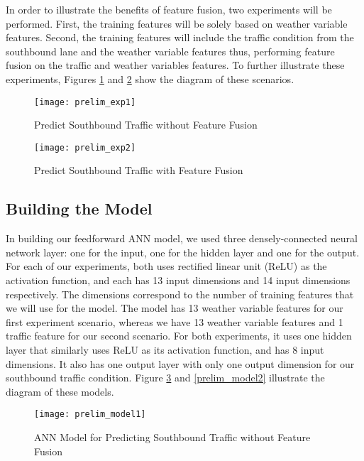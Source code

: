 In order to illustrate the benefits of feature fusion, two experiments will be performed. First, the training features will be solely based on weather variable features. Second, the training features will include the traffic condition from the southbound lane and the weather variable features thus, performing feature fusion on the traffic and weather variables features. To further illustrate these experiments, Figures \ref{figure:prelim_exp1} and \ref{figure:prelim_exp2} show the diagram of these scenarios.




\begin{figure}[!t]
\caption{Predict Southbound Traffic without Feature Fusion}
\centering
\texttt{[image: prelim\_exp1]}
\label{figure:prelim_exp1}
\end{figure}

\begin{figure}[!t]
\caption{Predict Southbound Traffic with Feature Fusion}
\centering
\texttt{[image: prelim\_exp2]}
\label{figure:prelim_exp2}
\end{figure}

\subsection{Building the Model}
In building our feedforward ANN model, we used three densely-connected neural network layer: one for the input, one for the hidden layer and one for the output. For each of our experiments, both uses rectified linear unit (ReLU) as the activation function, and each has 13 input dimensions and 14 input dimensions respectively. The dimensions correspond to the number of training features that we will use for the model. The model has 13 weather variable features for our first experiment scenario, whereas we have 13 weather variable features and 1 traffic feature for our second scenario. For both experiments, it uses one hidden layer that similarly uses ReLU as its activation function, and has 8 input dimensions. It also has one output layer with only one output dimension for our southbound traffic condition. Figure \ref{prelim_model1} and \ref{prelim_model2} illustrate the diagram of these models.


\begin{figure}[!t]
\caption{ANN Model for Predicting Southbound Traffic without Feature Fusion}
\centering
\texttt{[image: prelim\_model1]}
\label{prelim_model1}
\end{figure}

